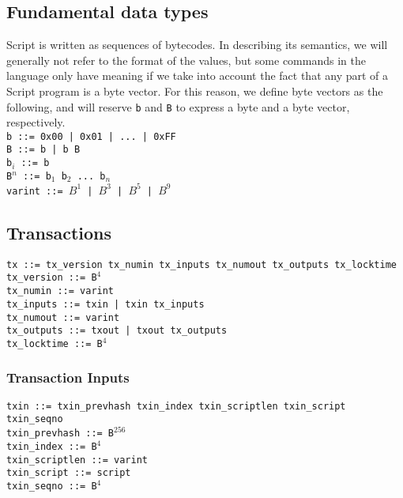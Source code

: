 \documentclass{article}
\begin{document}
\subsection{Fundamental data types}
Script is written as sequences of bytecodes. In describing its semantics, we will generally not refer to the format of the values, but some commands in the language only have meaning if we take into account the fact that any part of a Script program is a byte vector. For this reason, we define byte vectors as the following, and will reserve \texttt{b} and \texttt{B} to express a byte and a byte vector, respectively.\\


\noindent
\texttt{b ::= 0x00 | 0x01 | ... | 0xFF} \\
\texttt{B ::= b | b B} \\
\texttt{b$_i$ ::= b} \\
\texttt{B$^n$ ::= b$_1$ b$_2$ ... b$_n$} \\
\texttt{varint ::= $B^1$ | $B^3$ | $B^5$ | 	$B^9$}

\subsection{Transactions}
\noindent
\texttt{tx ::= tx\_version tx\_numin tx\_inputs tx\_numout tx\_outputs tx\_locktime  } \\
\texttt{tx\_version ::= B$^4$  } \\
\texttt{tx\_numin ::= varint  } \\
\texttt{tx\_inputs ::= txin | txin tx\_inputs   } \\
\texttt{tx\_numout ::= varint  } \\
\texttt{tx\_outputs ::= txout | txout tx\_outputs  } \\
\texttt{tx\_locktime ::= B$^4$  }

\subsubsection{Transaction Inputs}
\noindent
\texttt{txin ::= txin\_prevhash txin\_index txin\_scriptlen txin\_script txin\_seqno} \\
\texttt{txin\_prevhash ::= B$^{256}$} \\
\texttt{txin\_index ::= B$^4$} \\
\texttt{txin\_scriptlen ::= varint} \\
\texttt{txin\_script ::= script} \\
\texttt{txin\_seqno ::= B$^4$}
\end{document}
